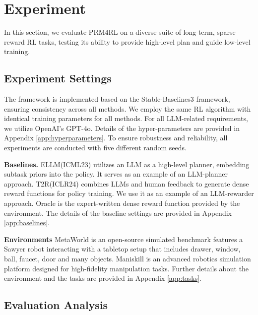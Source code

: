 \section{Experiment}\label{sec:experiments}
In this section, we evaluate PRM4RL on a diverse suite of long-term, sparse reward RL tasks, testing its ability to provide high-level plan and guide low-level training.

\subsection{Experiment Settings}\label{sec:experimental-settings}
The framework is implemented based on the Stable-Baselines3 framework\cite{stable-baselines3}, ensuring consistency across all methods. We employ the same RL algorithm with identical training parameters for all methods.
For all LLM-related requirements, we utilize OpenAI’s GPT-4o\cite{hurst2024gpt}.
Details of the hyper-parameters are provided in Appendix \ref{app:hyperparameters}.
To ensure robustness and reliability, all experiments are conducted with five different random seeds.

\textbf{Baselines.}
ELLM(ICML23) \cite{du2023guiding} utilizes an LLM as a high-level planner, embedding subtask priors into the policy. It serves as an example of an LLM-planner approach.
T2R(ICLR24) \cite{xie2024text2reward} combines LLMs and human feedback to generate dense reward functions for policy training. We use it as an example of an LLM-rewarder approach.
Oracle is the expert-written dense reward function provided by the environment. The details of the baseline settings are provided in Appendix \ref{app:baselines}.

\textbf{Environments}
MetaWorld\cite{yu2019meta}
is an open-source simulated benchmark features a Sawyer robot interacting with a tabletop setup that includes drawer, window, ball, faucet, door and many objects.
Maniskill\cite{taomaniskill3}
is an advanced robotics simulation platform designed for high-fidelity manipulation tasks. Further details about the environment and the tasks are provided in Appendix \ref{app:tasks}.

\subsection{Evaluation Analysis}
